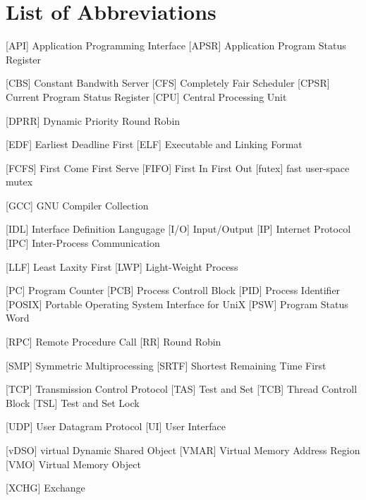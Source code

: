 
\chapter*{List of Abbreviations}

\begin{acronym} [POSIX]
 [API] {Application Programming Interface}
 [APSR] {Application Program Status Register}

 [CBS] {Constant Bandwith Server}
 [CFS] {Completely Fair Scheduler}
 [CPSR] {Current Program Status Register}
 [CPU] {Central Processing Unit}

 [DPRR] {Dynamic Priority Round Robin}

 [EDF] {Earliest Deadline First}
 [ELF] {Executable and Linking Format}

 [FCFS] {First Come First Serve}
 [FIFO] {First In First Out}
 [futex] {fast user-space mutex}

 [GCC] {GNU Compiler Collection}


 [IDL] {Interface Definition Langugage}
 [I/O] {Input/Output}
 [IP] {Internet Protocol}
[IPC] {Inter-Process Communication}



 [LLF] {Least Laxity First}
 [LWP] {Light-Weight Process}




 [PC] {Program Counter}
 [PCB] {Process Controll Block}
 [PID] {Process Identifier}
 [POSIX] {Portable Operating System Interface for UniX}
 [PSW] {Program Status Word}


 [RPC] {Remote Procedure Call}
 [RR] {Round Robin}

 [SMP] {Symmetric Multiprocessing}
 [SRTF] {Shortest Remaining Time First}

 [TCP] {Transmission Control Protocol}
 [TAS] {Test and Set}
 [TCB] {Thread Controll Block}
 [TSL] {Test and Set Lock}

 [UDP] {User Datagram Protocol} 
  [UI]  {User Interface}

 [vDSO] {virtual Dynamic Shared Object}
 [VMAR] {Virtual Memory Address Region}
  [VMO]  {Virtual Memory Object}


 [XCHG] {Exchange}



\end{acronym} 
